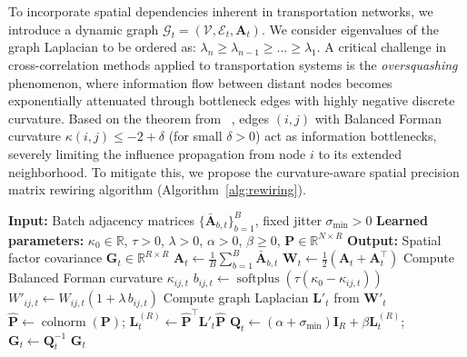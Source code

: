 \documentclass{article}
\theoremstyle{plain}
\theoremstyle{definition}
\theoremstyle{remark}
\newcommand{\calG}{\mathcal{G}}
\newcommand{\calE}{\mathcal{E}}
\begin{document}
To incorporate spatial dependencies inherent in transportation networks, we introduce a dynamic graph  $\calG_t = (\mathcal{V}, \calE_t, \mathbf{A}_t)$. We consider eigenvalues of the graph Laplacian to be ordered as: $\lambda_n \ge \lambda_{n-1} \ge ... \ge \lambda_1$.
A critical challenge in cross-correlation methods applied to transportation
systems is the \emph{oversquashing} phenomenon, where information flow
between distant nodes becomes exponentially attenuated through bottleneck
edges with highly negative discrete curvature. Based on the theorem from ~\cite{topping2022understandingoversquashingbottlenecksgraphs}, edges $(i,j)$ with Balanced
Forman curvature $\kappa(i,j) \le -2+\delta$ (for small $\delta > 0$) act as
information bottlenecks, severely limiting the influence propagation from
node $i$ to its extended neighborhood.
To mitigate this, we propose the curvature-aware spatial precision matrix
rewiring algorithm (Algorithm~\ref{alg:rewiring}).


\begin{algorithm}[t]
\caption{Curvature-Aware Spatial Precision Matrix Rewiring}
\label{alg:rewiring}
\begin{algorithmic}[1]
  \State \textbf{Input:} Batch adjacency matrices $\{\bar{\mathbf{A}}_{b,t}\}_{b=1}^B$,
    fixed jitter $\sigma_{\min}>0$
  \State \textbf{Learned parameters:} $\kappa_0\in\mathbb{R}$, $\tau>0$, $\lambda>0$,
    $\alpha>0$, $\beta\ge0$, $\mathbf{P}\in\mathbb{R}^{N\times R}$
    \quad{}
  \State \textbf{Output:} Spatial factor covariance $\mathbf{G}_t\in\mathbb{R}^{R\times R}$
  \State $\mathbf{A}_t \leftarrow \frac{1}{B}\sum_{b=1}^B \bar{\mathbf{A}}_{b,t}$
  \State $\mathbf{W}_t \leftarrow \tfrac{1}{2}(\mathbf{A}_t + \mathbf{A}_t^\top)$
    \State Compute Balanced Forman curvature $\kappa_{ij,t}$
    \State $b_{ij,t} \leftarrow \operatorname{softplus}(\tau(\kappa_0 - \kappa_{ij,t}))$
  \EndFor
    \State $W'_{ij,t} \leftarrow W_{ij,t}(1 + \lambda\, b_{ij,t})$
  \EndFor
  \State Compute graph Laplacian $\mathbf{L}'_t$ from $\mathbf{W}'_t$
  \State $\hat{\mathbf{P}} \leftarrow \operatorname{colnorm}(\mathbf{P})$;\quad
    $\mathbf{L}_t^{(R)} \leftarrow \hat{\mathbf{P}}^\top \mathbf{L}'_t \hat{\mathbf{P}}$
  \State $\mathbf{Q}_t \leftarrow (\alpha +\sigma_{\min}) \mathbf{I}_R + \beta\mathbf{L}_t^{(R)}$;\quad
    $\mathbf{G}_t \leftarrow \mathbf{Q}_t^{-1}$
  \State \Return $\mathbf{G}_t$
\end{algorithmic}
\end{algorithm}
\end{document}
